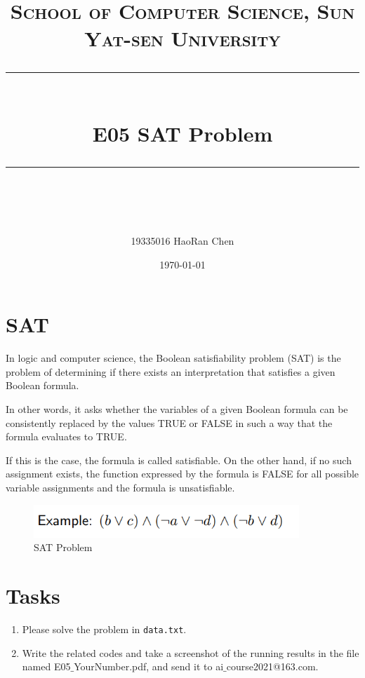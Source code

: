 \documentclass[UTF8]{ctexart}
\title{	
\normalfont \normalsize
\textsc{School of Computer Science, Sun Yat-sen University} \\ [25pt] %
\rule{\textwidth}{0.5pt} \\[0.4cm] %
\huge  E05 SAT Problem \\ %
\rule{\textwidth}{2pt} \\[0.5cm] %
\author{19335016 HaoRan Chen}
\date{\normalsize \today} 
}
\begin{document}
\maketitle
\tableofcontents
\newpage

\section{SAT}
In logic and computer science, the Boolean satisfiability problem (SAT) is the problem of determining if there exists an interpretation that satisfies a given Boolean formula.

In other words, it asks whether the variables of a given Boolean formula can be consistently replaced by the values TRUE or FALSE in such a way that the formula evaluates to TRUE.

If this is the case, the formula is called satisfiable. On the other hand, if no such assignment exists, the function expressed by the formula is FALSE for all possible variable assignments and the formula is unsatisfiable.

\begin{figure}[!h]
    \centering
    \includegraphics[width=10cm]{pic/example.png}
    \caption{SAT Problem}
    \label{fig:my_label}
\end{figure}

\section{Tasks}
\begin{enumerate}

\item  Please solve the problem in \texttt{data.txt}.

\item  Write the related codes and take a screenshot of the running results in the file named E05$\_$YourNumber.pdf, and send it to ai$\_$course2021@163.com.

\end{enumerate}
\end{document}

